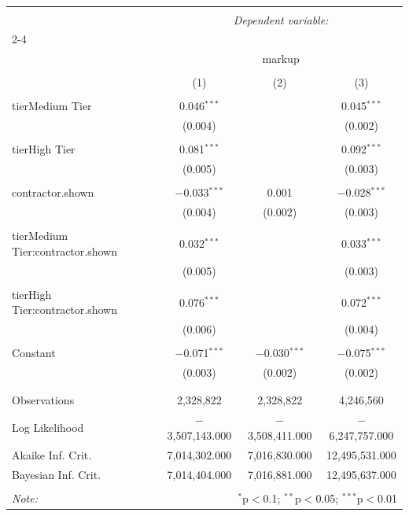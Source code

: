 
\begin{table}[!htbp] \centering 
  \caption{} 
  \label{} 
\begin{tabular}{@{\extracolsep{5pt}}lccc} 
\\[-1.8ex]\hline 
\hline \\[-1.8ex] 
 & \multicolumn{3}{c}{\textit{Dependent variable:}} \\ 
\cline{2-4} 
\\[-1.8ex] & \multicolumn{3}{c}{markup} \\ 
\\[-1.8ex] & (1) & (2) & (3)\\ 
\hline \\[-1.8ex] 
 tierMedium Tier & 0.046$^{***}$ &  & 0.045$^{***}$ \\ 
  & (0.004) &  & (0.002) \\ 
  & & & \\ 
 tierHigh Tier & 0.081$^{***}$ &  & 0.092$^{***}$ \\ 
  & (0.005) &  & (0.003) \\ 
  & & & \\ 
 contractor.shown & $-$0.033$^{***}$ & 0.001 & $-$0.028$^{***}$ \\ 
  & (0.004) & (0.002) & (0.003) \\ 
  & & & \\ 
 tierMedium Tier:contractor.shown & 0.032$^{***}$ &  & 0.033$^{***}$ \\ 
  & (0.005) &  & (0.003) \\ 
  & & & \\ 
 tierHigh Tier:contractor.shown & 0.076$^{***}$ &  & 0.072$^{***}$ \\ 
  & (0.006) &  & (0.004) \\ 
  & & & \\ 
 Constant & $-$0.071$^{***}$ & $-$0.030$^{***}$ & $-$0.075$^{***}$ \\ 
  & (0.003) & (0.002) & (0.002) \\ 
  & & & \\ 
\hline \\[-1.8ex] 
Observations & 2,328,822 & 2,328,822 & 4,246,560 \\ 
Log Likelihood & $-$3,507,143.000 & $-$3,508,411.000 & $-$6,247,757.000 \\ 
Akaike Inf. Crit. & 7,014,302.000 & 7,016,830.000 & 12,495,531.000 \\ 
Bayesian Inf. Crit. & 7,014,404.000 & 7,016,881.000 & 12,495,637.000 \\ 
\hline 
\hline \\[-1.8ex] 
\textit{Note:}  & \multicolumn{3}{r}{$^{*}$p$<$0.1; $^{**}$p$<$0.05; $^{***}$p$<$0.01} \\ 
\end{tabular} 
\end{table} 
